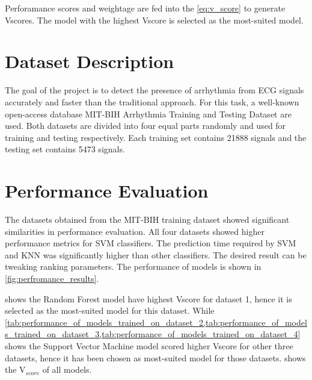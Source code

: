 Perforamance scores and weightage are fed into the \cref{eq:v_score} to generate Vscores. The model with the highest Vscore is selected as the most-suited model.

\section{Dataset Description} \label{sec:dataset_description}
The goal of the project is to detect the presence of arrhythmia from ECG signals accurately and faster than the traditional approach. For this task, a well-known open-access database MIT-BIH Arrhythmia Training and Testing Dataset are used. Both datasets are divided into four equal parts randomly and used for training and testing respectively. Each training set contains 21888 signals and the testing set contains 5473 signals.

\section{Performance Evaluation} \label{sec:performance_evaluation}
The datasets obtained from the MIT-BIH training dataset showed significant similarities in performance evaluation. All four datasets showed higher performance metrics for SVM classifiers. The prediction time required by SVM and KNN was significantly higher than other classifiers. The desired result can be tweaking ranking parameters. The performance of models is shown in \cref{fig:perfromance_results}.

 shows the Random Forest model have highest Vscore for dataset 1, hence it is selected as the most-suited model for this dataset. While \cref{tab:performance_of_models_trained_on_dataset_2,tab:performance_of_models_trained_on_dataset_3,tab:performance_of_models_trained_on_dataset_4} shows the Support Vector Machine model scored higher Vscore for other three datasets, hence it has been chosen as most-suited model for those datasets.  shows the V$_{score}$ of all models.

